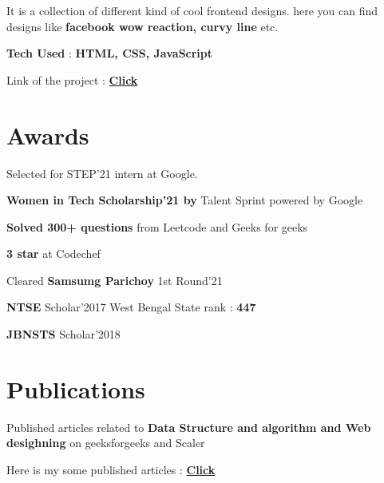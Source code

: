 \documentclass[]{deedy-resume-openfont}
\begin{document}
\begin{minipage}[t]{0.66\textwidth}
\begin{tightemize}
 \item It is a collection of different kind of cool frontend designs. here you can find designs like \textbf{facebook wow reaction, curvy line} etc.
\item \textbf{Tech Used} :\textbf{ HTML, CSS, JavaScript}
\item Link of the project :  \textbf{\href{https://github.com/chaltidutta/FrontEndProjects}{Click}} 
 \end{tightemize}
    
\sectionsep


\section{Awards} 
\begin{tightemize}
\item Selected for STEP’21 intern at Google.
\item \textbf{Women in Tech Scholarship’21 by }Talent Sprint powered by Google
\item  \textbf{Solved 300+ questions} from Leetcode and Geeks for geeks
\item\textbf{  3 star} at Codechef
\item Cleared\textbf{ Samsumg Parichoy} 1st Round’21
\item  \textbf{NTSE} Scholar’2017 West Bengal State rank :\textbf{ 447}
\item  \textbf{JBNSTS} Scholar’2018

\end{tightemize}
\sectionsep


\section{Publications} 
\begin{tightemize}
\item Published articles related to \textbf{Data Structure and algorithm and Web desighning} on geeksforgeeks and Scaler
\item Here is my some published articles : {\href{https://auth.geeksforgeeks.org/user/chalti/articles}{\textbf{Click}}} 
\end{tightemize}

\end{minipage} 
\end{document}
